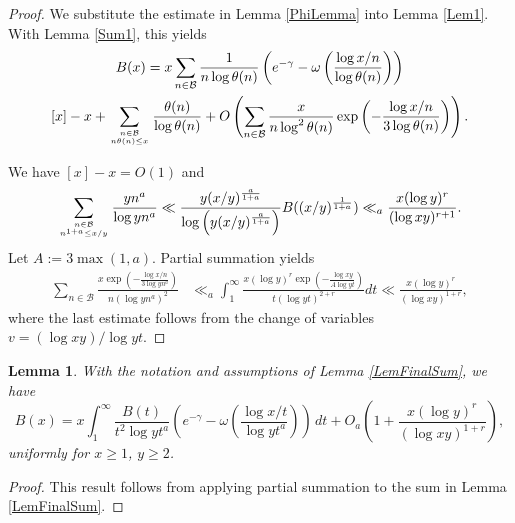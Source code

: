 \documentclass[11pt]{amsart}
\newtheorem{lemma}{Lemma}
\begin{document}
\begin{proof}
We substitute the estimate in Lemma \ref{PhiLemma} into Lemma \ref{Lem1}. With Lemma \ref{Sum1}, this yields
\begin{multline*}
B(x) = x\sum_{n\in \mathcal{B}}\frac{1}{n \log \theta(n)} \left( e^{-\gamma} - \omega\left(\frac{\log x/n}{\log \theta(n)}\right)\right)  \\
 [x]-x +\sum_{n\in \mathcal{B} \atop n\theta(n) \le x} \frac{\theta(n)}{\log \theta(n)}
+O\left(\sum_{n\in \mathcal{B}} \frac{x}{n \log^2 \theta(n)} \exp\left( -\frac{\log x/n}{3\log \theta(n)}\right)\right).
\end{multline*}

We have $[x]-x=O(1)$ and
\begin{equation*}
\sum_{n\in \mathcal{B} \atop n^{1+a}\le x/y} \frac{ y n^a}{\log yn^a} 
 \ll \frac{y (x/y)^\frac{a}{1+a}}{\log \left( y (x/y)^\frac{a}{1+a}\right) }B((x/y)^{\frac{1}{1+a}})
\ll_a \frac{x (\log y)^r}{(\log xy)^{r+1}}.
\end{equation*}
Let $A:=3\max(1,a)$. Partial summation yields
\begin{equation*}
\begin{split}
\sum_{n\in \mathcal{B} }\frac{x \exp\left(-\frac{\log x/n}{3\log yn^a}\right) }{n (\log yn^a)^2} 
 & \ll_a \int_{ 1}^\infty \frac{x (\log y)^r \exp\left(-\frac{\log xy}{A\log yt}\right)}{t (\log yt)^{2+r}}dt  
 \ll \frac{x(\log y)^r}{(\log xy)^{1+r}},
\end{split}
\end{equation*}
where the last estimate follows from the change of variables $v=(\log xy)/\log yt$. 
\end{proof}

\begin{lemma}\label{lem4}
With the notation and assumptions of Lemma \ref{LemFinalSum}, we have
\begin{equation*}
B(x)= x\int_{1}^{\infty} \frac{B(t)}{ t^2 \log y t^a} 
\left( e^{-\gamma} - \omega\left(\frac{\log x/t}{\log y t^a}\right)\right) \, dt
 + O_a\left(1+\frac{x (\log y)^r}{(\log x y)^{1+r}}\right),
\end{equation*}
uniformly for $x\ge 1$, $y\ge 2$. 
\end{lemma}

\begin{proof}
This result follows from applying partial summation to the sum in Lemma \ref{LemFinalSum}. 
\end{proof}
\end{document}

